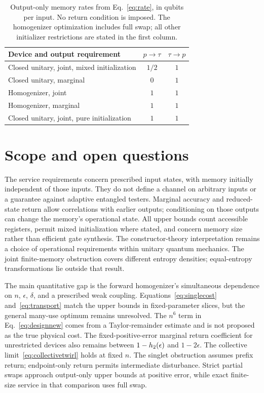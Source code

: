 \documentclass[aps,pra,reprint,superscriptaddress,longbibliography,nofootinbib,floatfix]{revtex4-2}
\begin{document}
\begin{table}[t]
\caption{Output-only memory rates from Eq.~\eqref{eq:rate}, in qubits per input. No return condition is imposed. The homogenizer optimization includes full swap; all other initializer restrictions are stated in the first column.}
\label{tab:outputonly}
\begin{ruledtabular}
\begin{tabular}{p{}cc}
Device and output requirement & $p\to\tau$ & $\tau\to p$\\
\hline
Closed unitary, joint, mixed initialization & $1/2$ & $1$\\
Closed unitary, marginal & $0$ & $1$\\
Homogenizer, joint & $1$ & $1$\\
Homogenizer, marginal & $1$ & $1$\\
Closed unitary, joint, pure initialization & $1$ & $1$
\end{tabular}
\end{ruledtabular}
\end{table}

\section{Scope and open questions}\label{sec:scope}

The service requirements concern prescribed input states, with memory initially independent of those inputs. They do not define a channel on arbitrary inputs or a guarantee against adaptive entangled testers. Marginal accuracy and reduced-state return allow correlations with earlier outputs; conditioning on those outputs can change the memory's operational state. All upper bounds count accessible registers, permit mixed initialization where stated, and concern memory size rather than efficient gate synthesis. The constructor-theory interpretation remains a choice of operational requirements within unitary quantum mechanics. The joint finite-memory obstruction covers different entropy densities; equal-entropy transformations lie outside that result.

The main quantitative gap is the forward homogenizer's simultaneous dependence on $n$, $\epsilon$, $\delta$, and a prescribed weak coupling. Equations~\eqref{eq:singlecost} and~\eqref{eq:transport} match the upper bounds in fixed-parameter slices, but the general many-use optimum remains unresolved. The $n^6$ term in Eq.~\eqref{eq:designnew} comes from a Taylor-remainder estimate and is not proposed as the true physical cost. The fixed-positive-error marginal return coefficient for unrestricted devices also remains between $1-h_2(\epsilon)$ and $1-2\epsilon$. The collective limit~\eqref{eq:collectivetwirl} holds at fixed $n$. The singlet obstruction assumes prefix return; endpoint-only return permits intermediate disturbance. Strict partial swaps approach output-only upper bounds at positive error, while exact finite-size service in that comparison uses full swap.
\end{document}
